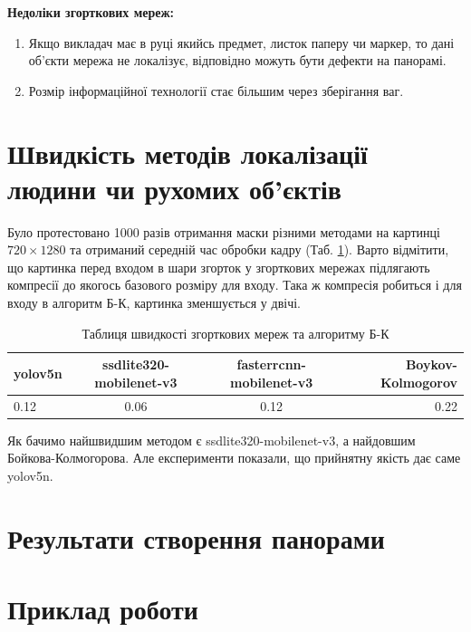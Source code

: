 \textbf{Недоліки згорткових мереж:}
\begin{enumerate}
    \item Якщо викладач має в руці якийсь предмет, листок паперу чи маркер, то дані
          об'єкти мережа не локалізує, відповідно можуть бути дефекти на панорамі.
    \item Розмір інформаційної технології стає більшим через зберігання ваг.
\end{enumerate}


\section{Швидкість методів локалізації людини чи рухомих об'єктів}

Було протестовано 1000 разів отримання маски різними методами на картинці $720 \times 1280$ та
отриманий середній час обробки кадру (Таб. \ref{tab:speed_methods_table}).
Варто відмітити, що картинка перед входом в шари згорток у згорткових мережах підлягають
компресії до якогось базового розміру для входу. Така ж компресія робиться і для входу
в алгоритм Б-К, картинка зменшується у двічі.

\begin{table}[H]
    \begin{center}
        \caption{Таблиця швидкості згорткових мереж та алгоритму Б-К}
        \label{tab:speed_methods_table}
        \begin{tabular}{l|c|c|r}
            \textbf{yolov5n} & \textbf{ssdlite320-mobilenet-v3} & \textbf{fasterrcnn-mobilenet-v3} & \textbf{Boykov-Kolmogorov} \\
            \hline
            0.12             & 0.06                             & 0.12                             & 0.22                       \\
        \end{tabular}
    \end{center}
\end{table}


Як бачимо найшвидшим методом є ssdlite320-mobilenet-v3, а найдовшим Бойкова-Колмогорова.
Але експерименти показали, що прийнятну якість дає саме yolov5n.

\section{Результати створення панорами}


\section{Приклад роботи}

